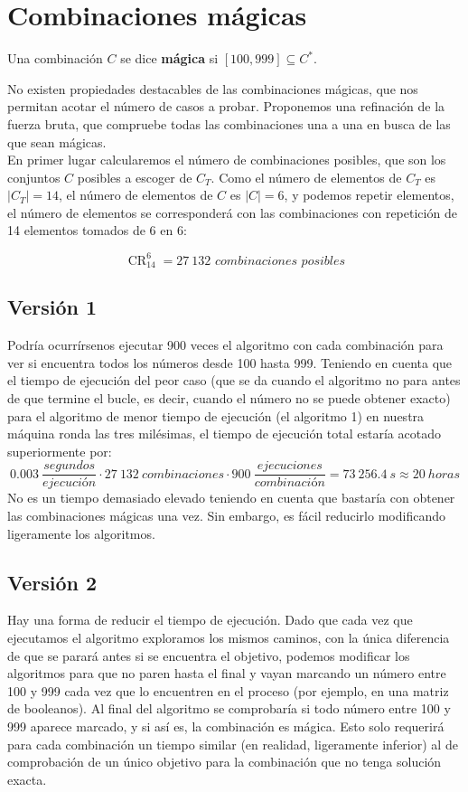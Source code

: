 \section{Combinaciones mágicas}

\begin{definition}
  Una combinación $C$ se dice \textbf{mágica} si $[100,999] \subseteq C^{\ast}$.
\end{definition}

No existen propiedades destacables de las combinaciones mágicas, que nos permitan
acotar el número de casos a probar. Proponemos una refinación de la fuerza bruta,
que compruebe todas las combinaciones una a una en busca de las que sean mágicas. \\

En primer lugar calcularemos el número de combinaciones posibles, que son 
los conjuntos $C$ posibles a escoger de $C_T$. Como el número de elementos de
$C_T$ es $|C_T| = 14$, el número de elementos de $C$ es $|C| = 6$, y
podemos repetir elementos, el número de elementos se corresponderá con
las combinaciones con repetición de 14 elementos tomados de 6 en 6:

\[\operatorname{CR}_{14}^{6} = 27\ 132 \textit{ combinaciones posibles}\]

\subsection{Versión 1}
Podría ocurrírsenos ejecutar 900 veces el algoritmo con cada combinación para
ver si encuentra todos los números desde 100 hasta 999.
Teniendo en cuenta que el tiempo de ejecución del peor caso (que se da cuando
el algoritmo no para antes de que termine el bucle, es decir, cuando el número
no se puede obtener exacto) para el algoritmo de menor tiempo de ejecución
(el algoritmo 1) en nuestra máquina ronda las tres milésimas, el
tiempo de ejecución total estaría acotado superiormente por:
$$ 0.003\ \frac{segundos}{ejecución} \cdot 27\ 132\ combinaciones \cdot 900\  \frac{ejecuciones}{combinación}=73\ 256.4\ s \approx 20\ horas$$
No es un tiempo demasiado elevado teniendo en cuenta que bastaría con obtener
las combinaciones mágicas una vez. Sin embargo, es fácil reducirlo modificando
ligeramente los algoritmos.

\subsection{Versión 2}
Hay una forma de reducir el tiempo de ejecución. Dado que cada vez que
ejecutamos el algoritmo exploramos los mismos caminos, con la única diferencia de
que se parará antes si se encuentra el objetivo, podemos modificar los
algoritmos para que no paren hasta el final y vayan marcando un número entre
100 y 999 cada vez que lo encuentren en el proceso (por ejemplo, en una
matriz de booleanos). Al final del algoritmo se comprobaría si todo número entre
100 y 999 aparece marcado, y si así es, la combinación es mágica. Esto solo
requerirá para cada combinación un tiempo similar (en realidad, ligeramente
inferior) al de comprobación de un único objetivo para la combinación que
no tenga solución exacta.


